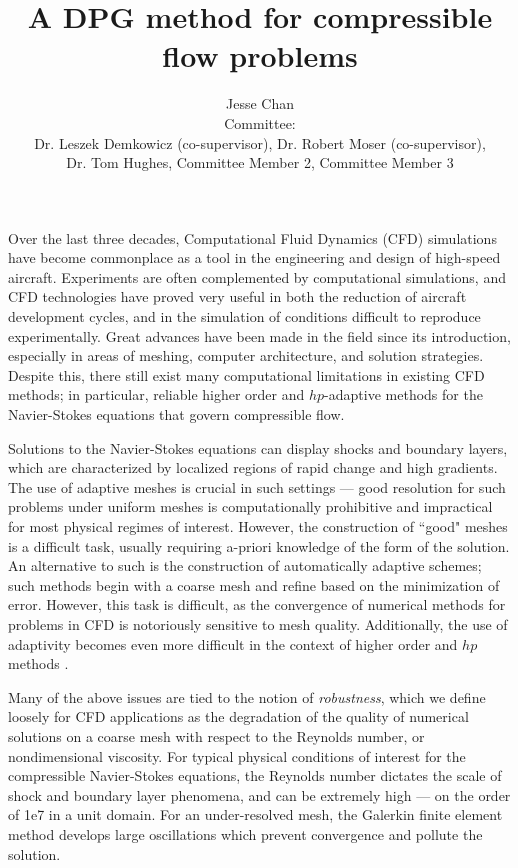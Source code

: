 \documentclass[12pt,letterpaper,oneside]{article}
\date{}
\author{Jesse Chan\\Committee: \vspace{-0.3cm}\\Dr. Leszek Demkowicz (co-supervisor), Dr. Robert Moser (co-supervisor),\vspace{-0.3cm}\\ Dr. Tom Hughes, Committee Member 2, Committee Member 3}
\title{A DPG method for compressible flow problems}
\begin{document}
\maketitle

Over the last three decades, Computational Fluid Dynamics (CFD) simulations have become commonplace as a tool in the engineering and design of high-speed aircraft.  Experiments are often complemented by computational simulations, and CFD technologies have proved very useful in both the reduction of aircraft development cycles, and in the simulation of conditions difficult to reproduce experimentally.  Great advances have been made in the field since its introduction, especially in areas of meshing, computer architecture, and solution strategies.  Despite this, there still exist many computational limitations in existing CFD methods; in particular, reliable higher order and $hp$-adaptive methods for the Navier-Stokes equations that govern compressible flow.

Solutions to the Navier-Stokes equations can display shocks and boundary layers, which are characterized by localized regions of rapid change and high gradients.  The use of adaptive meshes is crucial in such settings --- good resolution for such problems under uniform meshes is computationally prohibitive and impractical for most physical regimes of interest.  However, the construction of ``good" meshes is a difficult task, usually requiring a-priori knowledge of the form of the solution.  An alternative to such is the construction of automatically adaptive schemes; such methods begin with a coarse mesh and refine based on the minimization of error.  However, this task is difficult, as the convergence of numerical methods for problems in CFD is notoriously sensitive to mesh quality.  Additionally, the use of adaptivity becomes even more difficult in the context of higher order and $hp$ methods \cite{BoeingHigherOrder}.  

Many of the above issues are tied to the notion of \emph{robustness}, which we define loosely for CFD applications as the degradation of the quality of numerical solutions on a coarse mesh with respect to the Reynolds number, or nondimensional viscosity. For typical physical conditions of interest for the compressible Navier-Stokes equations, the Reynolds number dictates the scale of shock and boundary layer phenomena, and can be extremely high --- on the order of 1e7 in a unit domain.  For an under-resolved mesh, the Galerkin finite element method develops large oscillations which prevent convergence and pollute the solution.  
\end{document}
